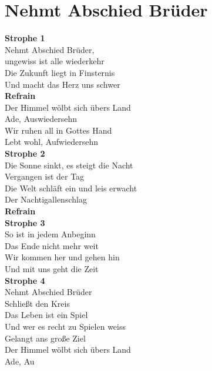 \documentclass[twoside,8pt]{scrartcl}
\begin{document}
\clearpage
\section{Nehmt Abschied Brüder}
\textbf{Strophe 1}\\
Nehmt Abschied Brüder,\\
ungewiss ist alle wiederkehr\\
Die Zukunft liegt in Finsternis\\
%
Und macht das Herz uns schwer\\
\newline
\textbf{Refrain}\\
Der Himmel wölbt sich übers Land\\
Ade, Auswiedersehn\\
Wir ruhen all in Gottes Hand\\
Lebt wohl, Aufwiedersehn\\
\newline
\textbf{Strophe 2}\\
Die Sonne sinkt, es steigt die Nacht\\
Vergangen ist der Tag\\
Die Welt schläft ein und leis erwacht\\
Der Nachtigallenschlag\\
\newline
\textbf{Refrain}\\
\newline
\textbf{Strophe 3}\\
So ist in jedem Anbeginn\\
Das Ende nicht mehr weit\\
Wir kommen her und gehen hin\\
Und mit uns geht die Zeit\\
\newline
\textbf{Strophe 4}\\
Nehmt Abschied Brüder\\
Schließt den Kreis\\
Das Leben ist ein Spiel\\
Und wer es recht zu Spielen weiss\\
Gelangt ans große Ziel\\
Der Himmel wölbt sich übers Land\\
Ade, Au\\
\end{document}
